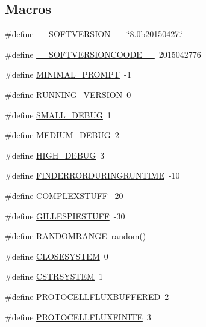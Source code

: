 \subsection*{Macros}
\begin{DoxyCompactItemize}
\item 
\#define \hyperlink{a00024_aab38659c2fe462437b89a1e85e619dc7}{\-\_\-\-\_\-\-S\-O\-F\-T\-V\-E\-R\-S\-I\-O\-N\-\_\-\-\_\-}~\char`\"{}8.\-0b20150427.\char`\"{}
\item 
\#define \hyperlink{a00024_ab95f82a54278bca76d1f3a974728825e}{\-\_\-\-\_\-\-S\-O\-F\-T\-V\-E\-R\-S\-I\-O\-N\-C\-O\-O\-D\-E\-\_\-\-\_\-}~2015042776
\item 
\#define \hyperlink{a00024_a972f6696f10f8159f336357f003493b6}{M\-I\-N\-I\-M\-A\-L\-\_\-\-P\-R\-O\-M\-P\-T}~-\/1
\item 
\#define \hyperlink{a00024_a72244054b9e2e45fe85cbef84bd42904}{R\-U\-N\-N\-I\-N\-G\-\_\-\-V\-E\-R\-S\-I\-O\-N}~0
\item 
\#define \hyperlink{a00024_a6f7711b8195edb3c3541c153ebcb4bfa}{S\-M\-A\-L\-L\-\_\-\-D\-E\-B\-U\-G}~1
\item 
\#define \hyperlink{a00024_ab0ead5a0a8c59ad5f4d9fcf0be28a5d7}{M\-E\-D\-I\-U\-M\-\_\-\-D\-E\-B\-U\-G}~2
\item 
\#define \hyperlink{a00024_ac2a71f467524d5299cbff5df96be638a}{H\-I\-G\-H\-\_\-\-D\-E\-B\-U\-G}~3
\item 
\#define \hyperlink{a00024_a0934dca9b46dc1ce8ccae606a6511f63}{F\-I\-N\-D\-E\-R\-R\-O\-R\-D\-U\-R\-I\-N\-G\-R\-U\-N\-T\-I\-M\-E}~-\/10
\item 
\#define \hyperlink{a00024_a186bfb39322832c790ce5403bc04330d}{C\-O\-M\-P\-L\-E\-X\-S\-T\-U\-F\-F}~-\/20
\item 
\#define \hyperlink{a00024_a27f5d30679c0e8877ba9246eb1a48ff4}{G\-I\-L\-L\-E\-S\-P\-I\-E\-S\-T\-U\-F\-F}~-\/30
\item 
\#define \hyperlink{a00024_a4cb4f6978b0d938a0523bd6946e7609d}{R\-A\-N\-D\-O\-M\-R\-A\-N\-G\-E}~random()
\item 
\#define \hyperlink{a00024_af1c170f636aa23e0e53a487ecf3994bd}{C\-L\-O\-S\-E\-S\-Y\-S\-T\-E\-M}~0
\item 
\#define \hyperlink{a00024_abbf4bce483f972294534d7148b928dc7}{C\-S\-T\-R\-S\-Y\-S\-T\-E\-M}~1
\item 
\#define \hyperlink{a00024_ab17e5a4ba4d937a561e57c9960a75115}{P\-R\-O\-T\-O\-C\-E\-L\-L\-F\-L\-U\-X\-B\-U\-F\-F\-E\-R\-E\-D}~2
\item 
\#define \hyperlink{a00024_a560cebce9c755a8ecb3887ad2d0b540e}{P\-R\-O\-T\-O\-C\-E\-L\-L\-F\-L\-U\-X\-F\-I\-N\-I\-T\-E}~3

\end{DoxyCompactItemize}
